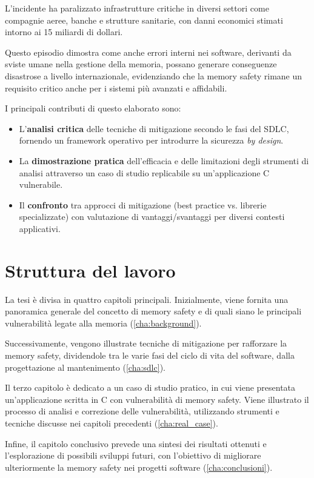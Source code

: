 L'incidente ha paralizzato infrastrutture critiche in diversi settori come
compagnie aeree, banche e strutture sanitarie, con danni economici stimati
intorno ai 15 miliardi di dollari.\cite{crowdstrike_bug_wired_cost}

Questo episodio dimostra come anche errori interni nei software, derivanti da
sviste umane nella gestione della memoria, possano generare conseguenze disastrose
a livello internazionale, evidenziando che la memory safety rimane un requisito
critico anche per i sistemi più avanzati e affidabili.

\bigskip
\noindent
I principali contributi di questo elaborato sono:
\begin{itemize}
  \item L'\textbf{analisi critica} delle tecniche di mitigazione secondo le fasi
    del SDLC, fornendo un framework operativo per introdurre la sicurezza \textit{by
    design}.

  \item La \textbf{dimostrazione pratica} dell'efficacia e delle limitazioni
    degli strumenti di analisi attraverso un caso di studio replicabile su un'applicazione
    C vulnerabile.

  \item Il \textbf{confronto} tra approcci di mitigazione (best practice vs.
    librerie specializzate) con valutazione di vantaggi/svantaggi per diversi contesti
    applicativi.
\end{itemize}

\section*{Struttura del lavoro}
\label{sec:structure} La tesi è divisa in quattro capitoli principali. Inizialmente,
viene fornita una panoramica generale del concetto di memory safety e di quali
siano le principali vulnerabilità legate alla memoria (\autoref{cha:background}).

Successivamente, vengono illustrate tecniche di mitigazione per rafforzare la memory
safety, dividendole tra le varie fasi del ciclo di vita del software, dalla progettazione
al mantenimento (\autoref{cha:sdlc}).

Il terzo capitolo è dedicato a un caso di studio pratico, in cui viene
presentata un'applicazione scritta in C con vulnerabilità di memory safety. Viene
illustrato il processo di analisi e correzione delle vulnerabilità, utilizzando
strumenti e tecniche discusse nei capitoli precedenti (\autoref{cha:real_case}).

Infine, il capitolo conclusivo prevede una sintesi dei risultati ottenuti e l'esplorazione
di possibili sviluppi futuri, con l'obiettivo di migliorare ulteriormente la
memory safety nei progetti software (\autoref{cha:conclusioni}).